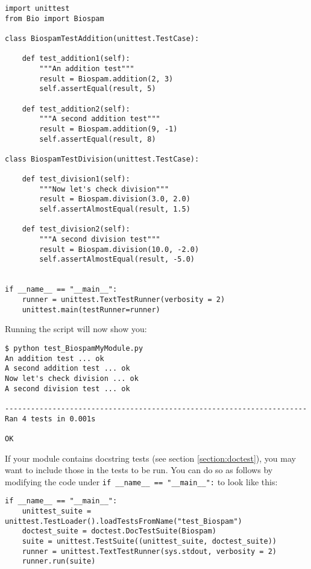 \documentclass{report}
\begin{document}
\begin{itemize}
\begin{verbatim}
import unittest
from Bio import Biospam

class BiospamTestAddition(unittest.TestCase):

    def test_addition1(self):
        """An addition test"""
        result = Biospam.addition(2, 3)
        self.assertEqual(result, 5)

    def test_addition2(self):
        """A second addition test"""
        result = Biospam.addition(9, -1)
        self.assertEqual(result, 8)

class BiospamTestDivision(unittest.TestCase):

    def test_division1(self):
        """Now let's check division"""
        result = Biospam.division(3.0, 2.0)
        self.assertAlmostEqual(result, 1.5)

    def test_division2(self):
        """A second division test"""
        result = Biospam.division(10.0, -2.0)
        self.assertAlmostEqual(result, -5.0)


if __name__ == "__main__":
    runner = unittest.TextTestRunner(verbosity = 2)
    unittest.main(testRunner=runner)
\end{verbatim}

        Running the script will now show you:

\begin{verbatim}
$ python test_BiospamMyModule.py
An addition test ... ok
A second addition test ... ok
Now let's check division ... ok
A second division test ... ok

----------------------------------------------------------------------
Ran 4 tests in 0.001s

OK
\end{verbatim}
\end{itemize}

If your module contains docstring tests (see section \ref{section:doctest}),
you may want to include those in the tests to be run. You can do so as
follows by modifying the code under \verb|if __name__ == "__main__":|
to look like this:

\begin{verbatim}
if __name__ == "__main__":
    unittest_suite = unittest.TestLoader().loadTestsFromName("test_Biospam")
    doctest_suite = doctest.DocTestSuite(Biospam)
    suite = unittest.TestSuite((unittest_suite, doctest_suite))
    runner = unittest.TextTestRunner(sys.stdout, verbosity = 2)
    runner.run(suite)
\end{verbatim}
\end{document}
